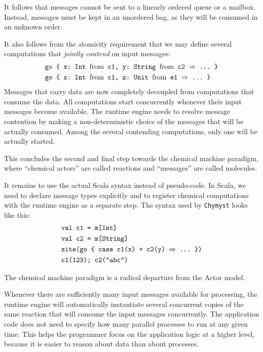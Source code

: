 \documentclass[sigplan,10pt,review,anonymous]{acmart}\settopmatter{printfolios=true}
\begin{document}
It follows that messages cannot be sent to a linearly ordered queue
or a mailbox. Instead, messages must be kept in an unordered bag,
as they will be consumed in an unknown order.

It also follows from the atomicity requirement that we may define
several computations that \emph{jointly contend} on input messages:
\begin{align*}
\text{} & \text{\texttt{go \{ x:~Int \textnormal{from} c1, y:~String \textnormal{from} c2 \ensuremath{\Rightarrow} ...~\}}}\\
 & \text{\texttt{go \{ x:~Int \textnormal{from} c1, z:~Unit \textnormal{from} e1 \ensuremath{\Rightarrow} ...~\}}}
\end{align*}
Messages that carry data are now completely decoupled from computations
that consume the data. All computations start concurrently whenever
their input messages become available. The runtime engine needs to
resolve message contention by making a non-deterministic choice of
the messages that will be actually consumed. Among the several contending
computations, only one will be actually started.

This concludes the second and final step towards the chemical machine
paradigm, where ``chemical actors'' are called reactions and ``messages'' are called molecules.

It remains to use the actual Scala syntax instead of pseudo-code.
In Scala, we need to declare message types explicitly and to register
chemical computations with the runtime engine as a separate step.
The syntax used by \texttt{Chymyst} looks like this:
\begin{align*}
\text{} & \text{\texttt{val c1 = m[Int]}}\\
 & \text{\texttt{val c2 = m[String]}}\\
 & \text{\texttt{site(go \{ case c1(x) + c2(y) \ensuremath{\Rightarrow} ...~\})}}\\
 & \text{\texttt{c1(123); }\texttt{c2("abc")}}
\end{align*}

The chemical machine paradigm is a radical departure
from the Actor model.

Whenever there are sufficiently many input messages available for
processing, the runtime engine will automatically instantiate several
concurrent copies of the same reaction that will consume the input
messages concurrently. The application code
does not need to specify how many parallel processes to run at any
given time.
This helps the programmer focus on the application logic at a higher level,
because it is easier to reason about data than about processes.
\end{document}
